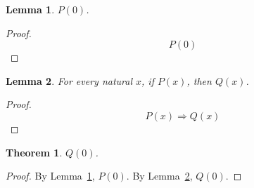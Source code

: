\documentclass{article}
\newtheorem{lemma}{Lemma}
\newtheorem{theorem}{Theorem}
\begin{document}
\begin{lemma}\label{lem:available}
$P(0)$.
\end{lemma}
\begin{proof}
\[
P(0)
\]
\end{proof}

\begin{lemma}\label{lem:transfer}
For every natural $x$, if $P(x)$, then $Q(x)$.
\end{lemma}
\begin{proof}
\[
P(x) \Rightarrow Q(x)
\]
\end{proof}

\begin{theorem}\label{thm:main}
$Q(0)$.
\end{theorem}
\begin{proof}
By Lemma~\ref{lem:available}, $P(0)$.
By Lemma~\ref{lem:transfer}, $Q(0)$.
\end{proof}
\end{document}
